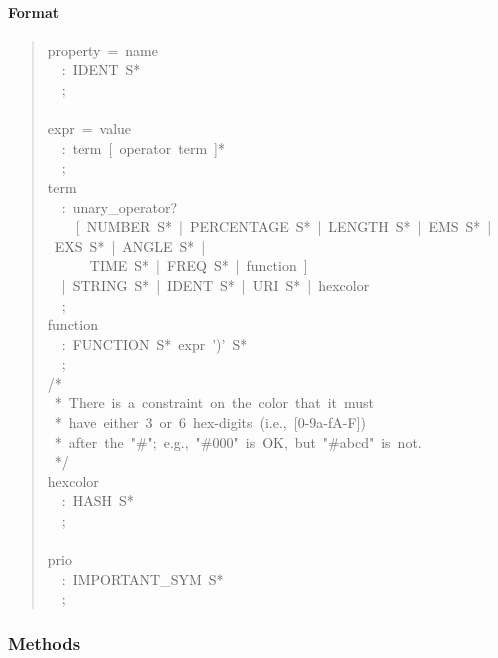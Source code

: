 
\hypertarget{format}{}
\paragraph*{Format}
\label{format}
\begin{quote}{\ttfamily \raggedright \noindent
property~=~name~\\
~~:~IDENT~S*~\\
~~;~\\
~\\
expr~=~value~\\
~~:~term~{[}~operator~term~{]}*~\\
~~;~\\
term~\\
~~:~unary{\_}operator?~\\
~~~~{[}~NUMBER~S*~|~PERCENTAGE~S*~|~LENGTH~S*~|~EMS~S*~|~EXS~S*~|~ANGLE~S*~|~\\
~~~~~~TIME~S*~|~FREQ~S*~|~function~{]}~\\
~~|~STRING~S*~|~IDENT~S*~|~URI~S*~|~hexcolor~\\
~~;~\\
function~\\
~~:~FUNCTION~S*~expr~')'~S*~\\
~~;~\\
/*~\\
~*~There~is~a~constraint~on~the~color~that~it~must~\\
~*~have~either~3~or~6~hex-digits~(i.e.,~{[}0-9a-fA-F{]})~\\
~*~after~the~"{\#}";~e.g.,~"{\#}000"~is~OK,~but~"{\#}abcd"~is~not.~\\
~*/~\\
hexcolor~\\
~~:~HASH~S*~\\
~~;~\\
~\\
prio~\\
~~:~IMPORTANT{\_}SYM~S*~\\
~~;
}\end{quote}


  \subsubsection{Methods}

